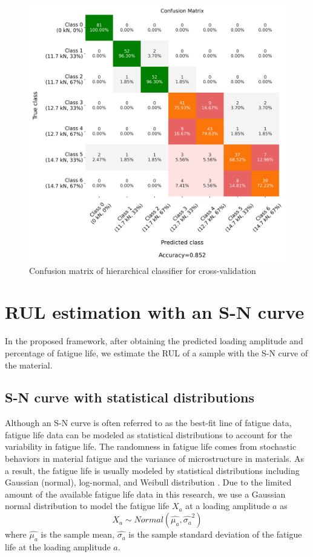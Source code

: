 \begin{figure}[tb]
    \centering
    \includegraphics[width=0.75\linewidth]{fig/hierarchical_confusion_matrix.png}
    \caption{Confusion matrix of hierarchical classifier for cross-validation}
    \label{fig: confu mat hier}
\end{figure}


\section{RUL estimation with an S-N curve}
In the proposed framework, after obtaining the predicted loading amplitude and percentage of fatigue life, we estimate the RUL of a sample with the S-N curve of the material.

\subsection{S-N curve with statistical distributions}
\label{subsec: statistical sn curve}
Although an S-N curve is often referred to as the best-fit line of fatigue data, fatigue life data can be modeled as statistical distributions to account for the variability in fatigue life. The randomness in fatigue life comes from stochastic behaviors in material fatigue and the variance of microstructure in materials. As a result, the fatigue life is usually modeled by statistical distributions including Gaussian (normal), log-normal, and Weibull distribution \cite{sn-curve-statistical-model-LI2016}. Due to the limited amount of the available fatigue life data in this research, we use a Gaussian normal distribution to model the fatigue life $X_a$ at a loading amplitude $a$ as
\begin{equation}
    X_a \sim Normal(\hat{\mu_{a}}, \hat{\sigma_{a}}^2)
\end{equation}
where $\hat{\mu_{a}}$ is the sample mean, $\hat{\sigma_{a}}$ is the sample standard deviation of the fatigue life at the loading amplitude $a$.

